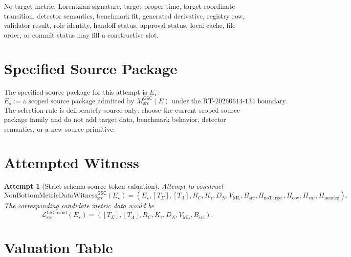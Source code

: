 \documentclass[11pt]{article}
\newtheorem{attempt}{Attempt}
\newcommand{\MsrcGSC}{M_{\mathrm{src}}^{\mathsf{GSC}}}
\newcommand{\Witness}{\mathrm{NonBottomMetricDataWitness}_{\mathrm{src}}^{\mathsf{GSC}}}
\newcommand{\MetricDataCand}{\mathcal{L}_{\mathrm{src}}^{\mathsf{GSC}\mbox{-}\mathrm{cand}}}
\begin{document}
No target metric, Lorentzian signature, target proper time, target coordinate
transition, detector semantics, benchmark fit, generated derivative, registry
row, validator result, role identity, handoff status, approval status, local
cache, file order, or commit status may fill a constructive slot.

\section{Specified Source Package}

The specified source package for this attempt is \(E_{\star}\):
\[
  E_{\star} := \text{a scoped source package admitted by }\MsrcGSC(E)
  \text{ under the RT-20260614-134 boundary.}
\]
The selection rule is deliberately source-only: choose the current scoped
source package family and do not add target data, benchmark behavior, detector
semantics, or a new source primitive.

\section{Attempted Witness}

\begin{attempt}[Strict-schema source-token valuation]
Attempt to construct
\[
  \Witness(E_{\star})
  =
  \left(
    E_{\star},
    [T_{\Sigma}],
    [T_{\Lambda}],
    R_C,
    K_{\tau},
    D_N,
    V_{\mathrm{ML}},
    B_{\mathrm{src}},
    \Pi_{\mathrm{noTarget}},
    \Pi_{\mathrm{cov}},
    \Pi_{\mathrm{var}},
    \Pi_{\mathrm{nondeg}}
  \right).
\]
The corresponding candidate metric data would be
\[
  \MetricDataCand(E_{\star})
  =
  \left(
    [T_{\Sigma}],
    [T_{\Lambda}],
    R_C,
    K_{\tau},
    D_N,
    V_{\mathrm{ML}},
    B_{\mathrm{src}}
  \right).
\]
\end{attempt}

\section{Valuation Table}
\end{document}
